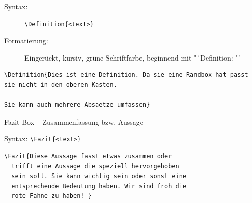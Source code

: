 \documentclass[
ngerman,
paper=a4,
asymmetric,
fontsize=10pt,
draft=false,
numbers=noenddot,
bibtotocnumbered,
footnotes=multiple,
toc=flat,
]{scrbook}
\newenvironment{Beispiel}
{\begin{tcolorbox}[title=Beispiel]

}{\end{tcolorbox}}
\begin{document}
\begin{description}
    \item[Syntax:] \lstinline$\Definition{<text>}$
    
    \item[Formatierung:] Eingerückt, kursiv, grüne Schriftfarbe, beginnend mit
    "`Definition: "`
\end{description}





\begin{Beispiel}
\begin{lstlisting}
\Definition{Dies ist eine Definition. Da sie eine Randbox hat passt sie nicht in den oberen Kasten.

Sie kann auch mehrere Absaetze umfassen}
\end{lstlisting}
\tcblower

\end{Beispiel}



\Text
{Fazit-Box -- }
{Zusammenfassung bzw. Aussage}
{}
{}
{}
{}

\begin{Beispiel}
Syntax: \lstinline$\Fazit{<text>}$

\begin{lstlisting}
\Fazit{Diese Aussage fasst etwas zusammen oder 
  trifft eine Aussage die speziell hervorgehoben 
  sein soll. Sie kann wichtig sein oder sonst eine 
  entsprechende Bedeutung haben. Wir sind froh die 
  rote Fahne zu haben! }
\end{lstlisting}
\tcblower
{}
\end{Beispiel}
\end{document}
